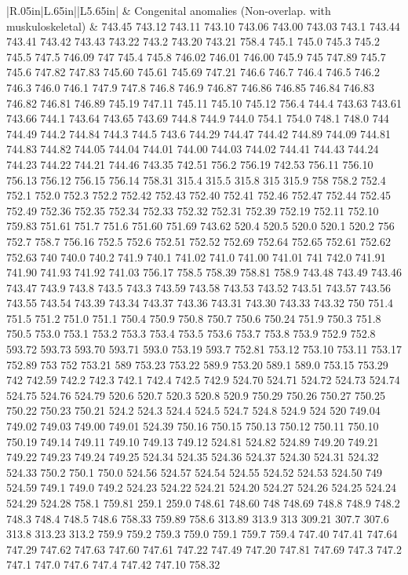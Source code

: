 \begin{longtable}{|R{.05in}|L{.65in}||L{5.65in}|}
    & Congenital  anomalies (Non-overlap. with muskuloskeletal)  &  743.45 743.12 743.11 743.10 743.06 743.00 743.03 743.1 743.44 743.41 743.42 743.43 743.22 743.2 743.20 743.21 758.4 745.1 745.0 745.3 745.2 745.5 747.5 746.09 747 745.4 745.8 746.02 746.01 746.00 745.9 745 747.89 745.7 745.6 747.82 747.83 745.60 745.61 745.69 747.21 746.6 746.7 746.4 746.5 746.2 746.3 746.0 746.1 747.9 747.8 746.8 746.9 746.87 746.86 746.85 746.84 746.83 746.82 746.81 746.89 745.19 747.11 745.11 745.10 745.12 756.4 744.4 743.63 743.61 743.66 744.1 743.64 743.65 743.69 744.8 744.9 744.0 754.1 754.0 748.1 748.0 744 744.49 744.2 744.84 744.3 744.5 743.6 744.29 744.47 744.42 744.89 744.09 744.81 744.83 744.82 744.05 744.04 744.01 744.00 744.03 744.02 744.41 744.43 744.24 744.23 744.22 744.21 744.46 743.35 742.51 756.2 756.19 742.53 756.11 756.10 756.13 756.12 756.15 756.14 758.31 315.4 315.5 315.8 315 315.9 758 758.2 752.4 752.1 752.0 752.3 752.2 752.42 752.43 752.40 752.41 752.46 752.47 752.44 752.45 752.49 752.36 752.35 752.34 752.33 752.32 752.31 752.39 752.19 752.11 752.10 759.83 751.61 751.7 751.6 751.60 751.69 743.62 520.4 520.5 520.0 520.1 520.2 756 752.7 758.7 756.16 752.5 752.6 752.51 752.52 752.69 752.64 752.65 752.61 752.62 752.63 740 740.0 740.2 741.9 740.1 741.02 741.0 741.00 741.01 741 742.0 741.91 741.90 741.93 741.92 741.03 756.17 758.5 758.39 758.81 758.9 743.48 743.49 743.46 743.47 743.9 743.8 743.5 743.3 743.59 743.58 743.53 743.52 743.51 743.57 743.56 743.55 743.54 743.39 743.34 743.37 743.36 743.31 743.30 743.33 743.32 750 751.4 751.5 751.2 751.0 751.1 750.4 750.9 750.8 750.7 750.6 750.24 751.9 750.3 751.8 750.5 753.0 753.1 753.2 753.3 753.4 753.5 753.6 753.7 753.8 753.9 752.9 752.8 593.72 593.73 593.70 593.71 593.0 753.19 593.7 752.81 753.12 753.10 753.11 753.17 752.89 753 752 753.21 589 753.23 753.22 589.9 753.20 589.1 589.0 753.15 753.29 742 742.59 742.2 742.3 742.1 742.4 742.5 742.9 524.70 524.71 524.72 524.73 524.74 524.75 524.76 524.79 520.6 520.7 520.3 520.8 520.9 750.29 750.26 750.27 750.25 750.22 750.23 750.21 524.2 524.3 524.4 524.5 524.7 524.8 524.9 524 520 749.04 749.02 749.03 749.00 749.01 524.39 750.16 750.15 750.13 750.12 750.11 750.10 750.19 749.14 749.11 749.10 749.13 749.12 524.81 524.82 524.89 749.20 749.21 749.22 749.23 749.24 749.25 524.34 524.35 524.36 524.37 524.30 524.31 524.32 524.33 750.2 750.1 750.0 524.56 524.57 524.54 524.55 524.52 524.53 524.50 749 524.59 749.1 749.0 749.2 524.23 524.22 524.21 524.20 524.27 524.26 524.25 524.24 524.29 524.28 758.1 759.81 259.1 259.0 748.61 748.60 748 748.69 748.8 748.9 748.2 748.3 748.4 748.5 748.6 758.33 759.89 758.6 313.89 313.9 313 309.21 307.7 307.6 313.8 313.23 313.2 759.9 759.2 759.3 759.0 759.1 759.7 759.4 747.40 747.41 747.64 747.29 747.62 747.63 747.60 747.61 747.22 747.49 747.20 747.81 747.69 747.3 747.2 747.1 747.0 747.6 747.4 747.42 747.10 758.32\\\hline
\end{longtable}
